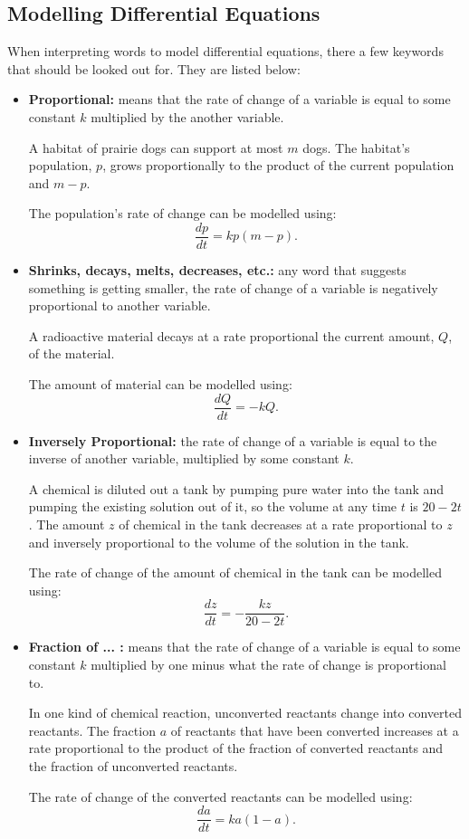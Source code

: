 \documentclass[12pt]{article}
\begin{document}
\subsection{Modelling Differential Equations}
When interpreting words to model differential equations, there a few keywords that should be looked out for. They are listed below:
\begin{itemize}
	\item \textbf{Proportional:} means that the rate of change of a variable is equal to some constant $k$ multiplied by the another variable.

	A habitat of prairie dogs can support at most $m$ dogs. The habitat's population, $p$, grows proportionally to the product of the current population and $m - p$.

	The population's rate of change can be modelled using:
	\[ \frac{dp}{dt} = kp(m - p). \]

	\item \textbf{Shrinks, decays, melts, decreases, etc.:} any word that suggests something is getting smaller, the rate of change of a variable is negatively proportional to another variable.

	A radioactive material decays at a rate proportional the current amount, $Q$, of the material.

	The amount of material can be modelled using:
	\[ \frac{dQ}{dt} = -kQ. \]

	\item \textbf{Inversely Proportional:} the rate of change of a variable is equal to the inverse of another variable, multiplied by some constant $k$.

	A chemical is diluted out a tank by pumping pure water into the tank and pumping the existing solution out of it, so the volume at any time $t$ is $20 - 2t$. The amount $z$ of chemical in the tank decreases at a rate proportional to $z$ and inversely proportional to the volume of the solution in the tank.

	The rate of change of the amount of chemical in the tank can be modelled using:
	\[ \frac{dz}{dt} = -\frac{kz}{20 - 2t}. \]

	\item \textbf{Fraction of ... :} means that the rate of change of a variable is equal to some constant $k$ multiplied by one minus what the rate of change is proportional to.

	In one kind of chemical reaction, unconverted reactants change into converted reactants. The fraction $a$ of reactants that have been converted increases at a rate proportional to the product of the fraction of converted reactants and the fraction of unconverted reactants.

	The rate of change of the converted reactants can be modelled using:
	\[ \frac{da}{dt} = ka(1 - a). \]
\end{itemize}
\end{document}

